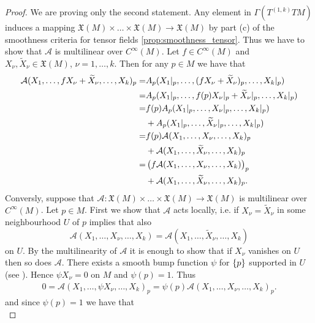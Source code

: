 \begin{proof}
We are proving only the second statement. Any element in $\Gamma(T^{(1,k)}TM)$ induces a mapping $\mathfrak{X}(M) \times \dots \times \mathfrak{X}(M) \to \mathfrak{X}(M)$ by part (c) of the smoothness criteria for tensor fields \ref{prop:smoothness_tensor}. Thus we have to show that $\mathcal{A}$ is multilinear over $C^\infty(M)$. Let $f \in C^\infty(M)$ and $X_\nu,\widetilde{X}_\nu \in \mathfrak{X}(M)$, $\nu = 1,\dots,k$. Then for any $p \in M$ we have that
\begin{align*}
\mathcal{A}(X_1,\dots,fX_\nu + \widetilde{X}_\nu,\dots,X_k)_p =& A_p(X_1\vert_p,\dots,(fX_\nu + \widetilde{X}_\nu)_p,\dots,X_k\vert_p)\\
=& A_p(X_1\vert_p,\dots,f(p)X_\nu\vert_p + \widetilde{X}_\nu\vert_p,\dots,X_k\vert_p)\\
=& f(p)A_p(X_1\vert_p,\dots,X_\nu\vert_p ,\dots,X_k\vert_p)\\
& + A_p(X_1\vert_p,\dots,\widetilde{X}_\nu\vert_p,\dots,X_k\vert_p)\\
=& f(p) \mathcal{A}(X_1,\dots,X_\nu,\dots,X_k)_p\\
& + \mathcal{A}(X_1,\dots,\widetilde{X}_\nu,\dots,X_k)_p\\
=& \del[1]{f \mathcal{A}(X_1,\dots,X_\nu,\dots,X_k)}_p \\
& + \mathcal{A}(X_1,\dots,\widetilde{X}_\nu,\dots,X_k)_p.
\end{align*}
Conversly, suppose that $\mathcal{A}: \mathfrak{X}(M) \times \dots \times \mathfrak{X}(M) \to \mathfrak{X}(M)$ is multilinear over $C^\infty(M)$. Let $p \in M$. First we show that $\mathcal{A}$ acts locally, i.e. if $X_\nu = \widetilde{X}_\nu$ in some neighbourhood $U$ of $p$ implies that also 
\begin{equation*}
\mathcal{A}(X_1,\dots,X_\nu,\dots,X_k) = \mathcal{A}(X_1,\dots,\widetilde{X}_\nu,\dots,X_k)
\end{equation*}
\noindent on $U$. By the multilinearity of $\mathcal{A}$ it is enough to show that if $X_\nu$ vanishes on $U$ then so does $\mathcal{A}$. There exists a smooth bump function $\psi$ for $\cbr[0]{p}$ supported in $U$ (see \cite[44]{lee:smooth_manifolds:2013}). Hence $\psi X_\nu = 0$ on $M$ and $\psi(p) = 1$. Thus
\begin{align*}
0 = \mathcal{A}(X_1,\dots,\psi X_\nu,\dots,X_k)_p = \psi(p)\mathcal{A}(X_1,\dots,X_\nu,\dots,X_k)_p.
\end{align*}
\noindent and since $\psi(p) = 1$ we have that
\begin{equation*}

\end{equation*}
\end{proof}
